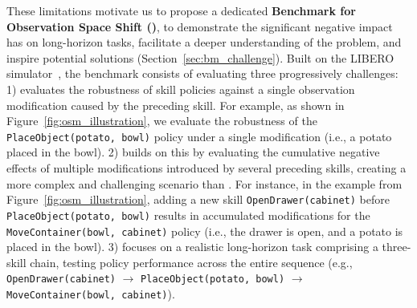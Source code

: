 


These limitations motivate us to propose a dedicated \textbf{Benchmark for Observation Space Shift (\bm)}, to demonstrate the significant negative impact \pb has on long-horizon tasks, facilitate a deeper understanding of the problem, and inspire potential solutions (Section~\ref{sec:bm_challenge}). Built on the LIBERO simulator~\cite{liu2024libero}, the benchmark consists of evaluating three progressively challenges:
1) \bma evaluates the robustness of skill policies against a single observation modification caused by the preceding skill. For example, as shown in Figure~\ref{fig:osm_illustration}, we evaluate the robustness of the \texttt{PlaceObject(potato, bowl)} policy under a single modification (i.e., a potato placed in the bowl). 
2) \bmb builds on this by evaluating the cumulative negative effects of multiple modifications introduced by several preceding skills, creating a more complex and challenging scenario than \bma. For instance, in the example from Figure~\ref{fig:osm_illustration}, adding a new skill \texttt{OpenDrawer(cabinet)} before \texttt{PlaceObject(potato, bowl)} results in accumulated modifications for the \texttt{MoveContainer(bowl, cabinet)} policy (i.e., the drawer is open, and a potato is placed in the bowl).
3) \bmc focuses on a realistic long-horizon task comprising a three-skill chain, testing policy performance across the entire sequence (e.g., \texttt{OpenDrawer(cabinet)} $\rightarrow$ \texttt{PlaceObject(potato, bowl)} $\rightarrow$ \texttt{MoveContainer(bowl, cabinet)}). 

